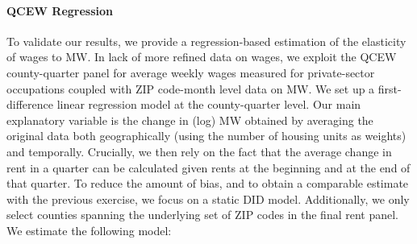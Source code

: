 %
%
%
%
%
%
%

\paragraph{QCEW Regression} To validate our results, we provide a 
regression-based estimation of the elasticity of wages to MW. In lack of more refined data on wages, 
we exploit the QCEW county-quarter panel for average weekly wages measured for private-sector occupations
coupled with ZIP code-month level data on MW. We set up a first-difference linear regression model at the 
county-quarter level. Our main explanatory variable is the change in (log) MW obtained by averaging the 
original data both geographically (using the number of housing units as weights) and temporally. 
Crucially, we then rely on the fact that the average change in rent in a quarter can be calculated 
given rents at the beginning and at the end of that quarter. To reduce the amount of bias, and to obtain 
a comparable estimate with the previous exercise, we focus on a static DID model. Additionally, we only 
select counties spanning the underlying set of ZIP codes in the final rent panel. We estimate the following model: 

